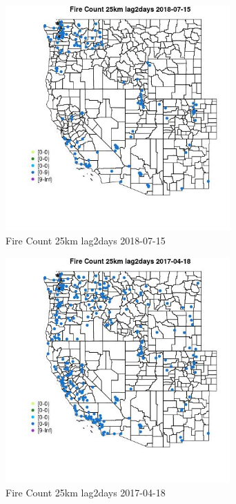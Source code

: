 \begin{figure} 
\centering  
\includegraphics[width=0.77\textwidth]{Code_Outputs/Report_ML_input_PM25_Step4_part_e_de_duplicated_aves_compiled_2019-05-21wNAs_MapObsFire_Count_25km_lag2days2018-07-15.jpg} 
\caption{\label{fig:Report_ML_input_PM25_Step4_part_e_de_duplicated_aves_compiled_2019-05-21wNAsMapObsFire_Count_25km_lag2days2018-07-15}Fire Count 25km lag2days 2018-07-15} 
\end{figure} 
 

\clearpage 

\begin{figure} 
\centering  
\includegraphics[width=0.77\textwidth]{Code_Outputs/Report_ML_input_PM25_Step4_part_e_de_duplicated_aves_compiled_2019-05-21wNAs_MapObsFire_Count_25km_lag2days2017-04-18.jpg} 
\caption{\label{fig:Report_ML_input_PM25_Step4_part_e_de_duplicated_aves_compiled_2019-05-21wNAsMapObsFire_Count_25km_lag2days2017-04-18}Fire Count 25km lag2days 2017-04-18} 
\end{figure} 
 

